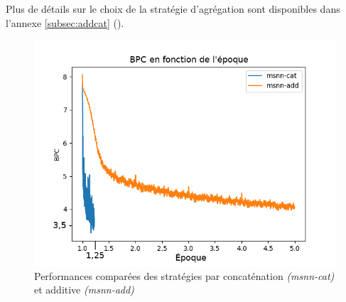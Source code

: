 Plus de détails sur le choix de la stratégie d'agrégation sont disponibles dans l'annexe \ref{subsec:addcat} (). 

\begin{figure}[H]
	\centering
	\includegraphics[width=\textwidth]{parts/appendix/reports-gmsnn/docs_esteban-latex/test_reports/comparative-bpc-msnn-det-msnn-cat_modif.png}
	\caption[Performances comparées des stratégies additive et par concaténation]{Performances comparées des stratégies par concaténation \textit{(msnn-cat)} et additive \textit{(msnn-add)}}\label{fig:addcat}
\end{figure}